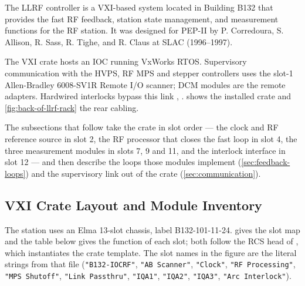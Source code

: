 The LLRF controller is a VXI-based system located in Building B132 that provides the fast RF feedback, station state management, and measurement functions for the RF station. It was designed for PEP-II by P. Corredoura, S. Allison, R. Sass, R. Tighe, and R. Claus at SLAC (1996--1997).

The VXI crate hosts an IOC running VxWorks RTOS. Supervisory communication with the HVPS, RF MPS and stepper controllers uses the slot-1 Allen-Bradley 6008-SV1R Remote I/O scanner; DCM modules are the remote adapters. Hardwired interlocks bypass this link , .  shows the installed crate and \cref{fig:back-of-llrf-rack} the rear cabling.

The subsections that follow take the crate in slot order --- the clock and RF reference source in slot 2, the RF processor that closes the fast loop in slot 4, the three measurement modules in slots 7, 9 and 11, and the interlock interface in slot 12 --- and then describe the loops those modules implement (\cref{sec:feedback-loops}) and the supervisory link out of the crate (\cref{sec:communication}).



\subsection{VXI Crate Layout and Module Inventory}

The station uses an Elma 13-slot chassis, label B132-101-11-24.  gives the slot map and the table below gives the function of each slot; both follow the RCS head of , which instantiates the crate template. The slot names in the figure are the literal strings from that file (\texttt{"B132-IOCRF"}, \texttt{"AB\ Scanner"}, \texttt{"Clock"}, \texttt{"RF\ Processing"}, \texttt{"MPS\ Shutoff"}, \texttt{"Link\ Passthru"}, \texttt{"IQA1"}, \texttt{"IQA2"}, \texttt{"IQA3"}, \texttt{"Arc\ Interlock"}).

